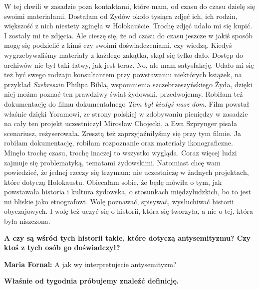 \begin{otherlanguage}{polish}
W tej chwili w zasadzie poza kontaktami, które mam, od czasu do czasu dzielę się swoimi materiałami. Dostałam od Żydów około tysiąca zdjęć ich, ich rodzin, większość z nich niestety zginęła w Holokauście. Trochę zdjęć udało mi się kupić. I zostały mi te zdjęcia. Ale cieszę się, że od czasu do czasu jeszcze w jakiś sposób mogę się podzielić z kimś czy swoimi doświadczeniami, czy wiedzą. Kiedyś wygrzebywaliśmy materiały z każdego zakątka, skąd się tylko dało. Dostęp do archiwów nie był taki łatwy, jak jest teraz. No, ale mam satysfakcję. Udało mi się też być swego rodzaju konsultantem przy powstawaniu niektórych książek, na przykład \textit{Szebreszin} Philipa Bibla, wspomnienia szczebrzeszyńskiego Żyda, dzięki niej można poznać ten prawdziwy świat żydowski, przedwojenny. Robiłam też dokumentację do filmu dokumentalnego \textit{Tam był kiedyś nasz dom}. Film powstał właśnie dzięki Yoramowi, ze strony polskiej w zdobywaniu pieniędzy w zasadzie na cały ten projekt uczestniczył Mirosław Chojecki, a Ewa Szprynger pisała scenariusz, reżyserowała. Zresztą też zaprzyjaźniłyśmy się przy tym filmie. Ja robiłam dokumentację, robiłam rozpoznanie oraz materiały ikonograficzne. Minęło trochę czasu, trochę inaczej to wszystko wygląda. Coraz więcej ludzi zajmuje się problematyką, tematami żydowskimi. Natomiast chcę wam powiedzieć, że jednej rzeczy się trzymam: nie uczestniczę w żadnych projektach, które dotyczą Holokaustu. Obiecałam sobie, że będę mówiła o tym, jak powstawała historia i kultura żydowska, o stosunkach międzyludzkich, bo to jest mi bliskie jako etnografowi. Wolę poznawać, spisywać, wysłuchiwać historii obyczajowych. I wolę też uczyć się o historii, która się tworzyła, a nie o tej, która była niszczona. 

\textbf{A czy są wśród tych historii takie, które dotyczą antysemityzmu? Czy ktoś z tych osób go doświadczył?}
 
\textbf{Maria Fornal:} A jak wy interpretujecie antysemityzm?

\textbf{Właśnie od tygodnia próbujemy znaleźć definicję.}


\end{otherlanguage}
